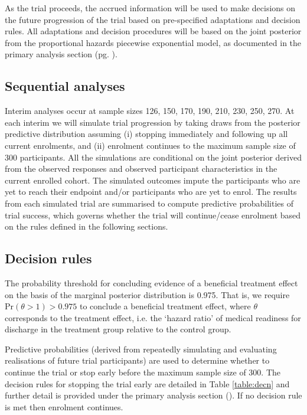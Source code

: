 \documentclass[a4paper]{article}
\begin{document}
As the trial proceeds, the accrued information will be used to make decisions on the future progression of the trial based on pre-specified adaptations and decision rules.
All adaptations and decision procedures will be based on the joint posterior from the proportional hazards piecewise exponential model, as documented in the primary analysis section (pg. \pageref{primary-analysis}).

\subsection{Sequential analyses}

Interim analyses occur at sample sizes 126, 150, 170, 190, 210, 230, 250, 270.
At each interim we will simulate trial progression by taking draws from the posterior predictive distribution assuming (i) stopping immediately and following up all current enrolments, and (ii) enrolment continues to the maximum sample size of 300 participants.
All the simulations are conditional on the joint posterior derived from the observed responses and observed participant characteristics in the current enrolled cohort.
The simulated outcomes impute the participants who are yet to reach their endpoint and/or participants who are yet to enrol.
The results from each simulated trial are summarised to compute predictive probabilities of trial success, which governs whether the trial will continue/cease enrolment based on the rules defined in the following sections.

\subsection{Decision rules}

The probability threshold for concluding evidence of a beneficial treatment effect on the basis of the marginal posterior distribution is 0.975.
That is, we require $\text{Pr}(\theta > 1) > 0.975$ to conclude a beneficial treatment effect, where $\theta$ corresponds to the treatment effect, i.e. the `hazard ratio' of medical readiness for discharge in the treatment group relative to the control group.

Predictive probabilities (derived from repeatedly simulating and evaluating realisations of future trial participants) are used to determine whether to continue the trial or stop early before the maximum sample size of 300. 
The decision rules for stopping the trial early are detailed in Table \ref{table:decn} and further detail is provided under the primary analysis section (\pageref{primary-analysis}).
If no decision rule is met then enrolment continues.
\end{document}
